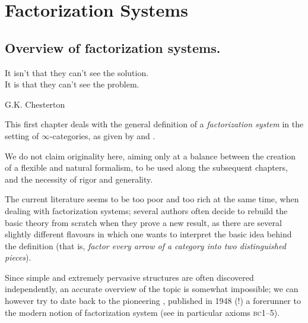 \chapter{Factorization Systems}\label{chap:effe.esse}
\thispagestyle{empty}
\section{Overview of factorization systems.}
\setlength{\epigraphwidth}{.75\textwidth}
\epigraph{It isn't that they can't see the solution.\\ It is that they can't see the problem.}{G.K. Chesterton}
This first chapter deals with the general definition of a \emph{factorization system} in the setting of $\infty$\hyp{}categories, as given by \cite{HTT} and \cite[ \textbf{178}]{Joy}.

We do not claim originality here, aiming only at a balance between the creation of a flexible and natural formalism, to be used along the subsequent chapters, and the necessity of rigor and generality.

The current literature seems to be too poor and too rich at the same time, when dealing with factorization systems; several authors often decide to rebuild the basic theory from scratch when they prove a new result, as there are several slightly different flavours in which one wants to interpret the basic idea behind the definition (that is, \emph{factor every arrow of a category into two distinguished pieces}).

Since simple and extremely pervasive structures are often discovered independently, an accurate overview of the topic is somewhat impossible; we can however try to date back to the pioneering \cite{maclane1948groups}, published in 1948 (!) a forerunner to the modern notion of factorization system (see in particular axioms \textsc{bc}1--5).

